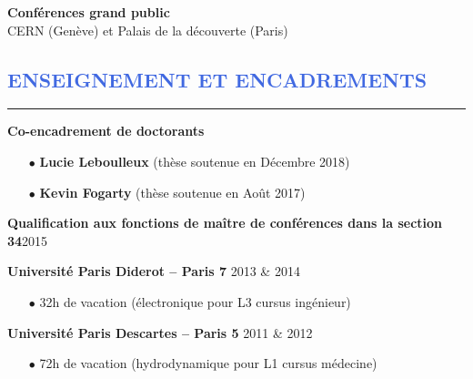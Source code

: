 \documentclass[11pt, a4paper, french]{article}
\begin{document}
\vspace{0.4cm}
\textbf{Conférences grand public}   \\
\hspace{0.3cm} CERN (Genève) et Palais de la découverte (Paris)\\





\textcolor{RoyalBlue}{\section{\large ENSEIGNEMENT ET ENCADREMENTS}
\vspace{-0.2cm}\hrule}
\vspace{0.4cm}

\textbf{Co-encadrement de doctorants}\\
\vspace{-0.3cm}

\begin{itemize} \itemsep 5pt
    \item[$\bullet$] \textbf{Lucie Leboulleux} (thèse soutenue en Décembre 2018)
    \item[$\bullet$] \textbf{Kevin Fogarty} (thèse soutenue en Août 2017)\\
\end{itemize}
\textbf{Qualification aux fonctions de maître de conférences dans la section 34}\hfill  2015

\vspace{0.3cm}
\textbf{Universit\'e Paris Diderot -- Paris 7} \hfill  		 2013 \& 2014
\begin{itemize} \itemsep 5pt
    \item[$\bullet$] 32h de vacation (électronique pour L3 cursus ingénieur)\\
\end{itemize}

\textbf{Universit\'e Paris Descartes -- Paris 5} \hfill  		 2011 \& 2012
\begin{itemize} \itemsep 5pt
    \item[$\bullet$] 72h de vacation (hydrodynamique pour L1 cursus médecine)\\
\end{itemize}
\end{document}
